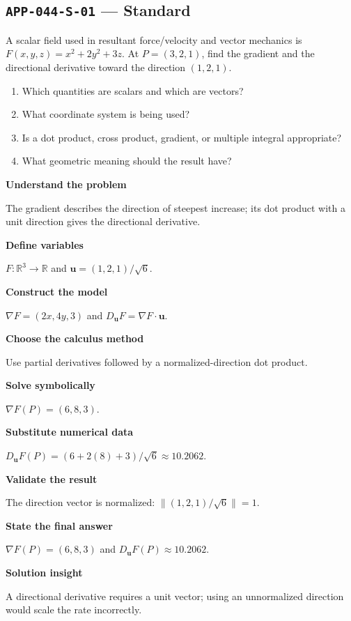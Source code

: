 \documentclass[11pt]{book}
\newcommand{\pid}[1]{\texttt{#1}}
\begin{document}
\subsection*{\pid{APP-044-S-01} — Standard}
\begin{problembox}
A scalar field used in resultant force/velocity and vector mechanics is $F(x,y,z)=x^2+2y^2+3z$. At $P=(3,2,1)$, find the gradient and the directional derivative toward the direction $(1,2,1)$.
\end{problembox}
\begin{promptbox}\begin{enumerate}
\item Which quantities are scalars and which are vectors?
\item What coordinate system is being used?
\item Is a dot product, cross product, gradient, or multiple integral appropriate?
\item What geometric meaning should the result have?
\end{enumerate}\end{promptbox}
\begin{solutionbox}
\textbf{Understand the problem}\par The gradient describes the direction of steepest increase; its dot product with a unit direction gives the directional derivative.\par\medskip
\textbf{Define variables}\par $F:\mathbb R^3\to\mathbb R$ and $\mathbf u=(1,2,1)/\sqrt6$.\par\medskip
\textbf{Construct the model}\par $\nabla F=(2x,4y,3)$ and $D_{\mathbf u}F=\nabla F\cdot\mathbf u$.\par\medskip
\textbf{Choose the calculus method}\par Use partial derivatives followed by a normalized-direction dot product.\par\medskip
\textbf{Solve symbolically}\par $\nabla F(P)=(6,8,3)$.\par\medskip
\textbf{Substitute numerical data}\par $D_{\mathbf u}F(P)=(6+2(8)+3)/\sqrt6\approx 10.2062$.\par\medskip
\textbf{Validate the result}\par The direction vector is normalized: $\|(1,2,1)/\sqrt6\|=1$.\par\medskip
\textbf{State the final answer}\par $\nabla F(P)=(6,8,3)$ and $D_{\mathbf u}F(P)\approx 10.2062$.\par\medskip
\textbf{Solution insight}\par A directional derivative requires a unit vector; using an unnormalized direction would scale the rate incorrectly.\par\medskip
\end{solutionbox}
\end{document}
